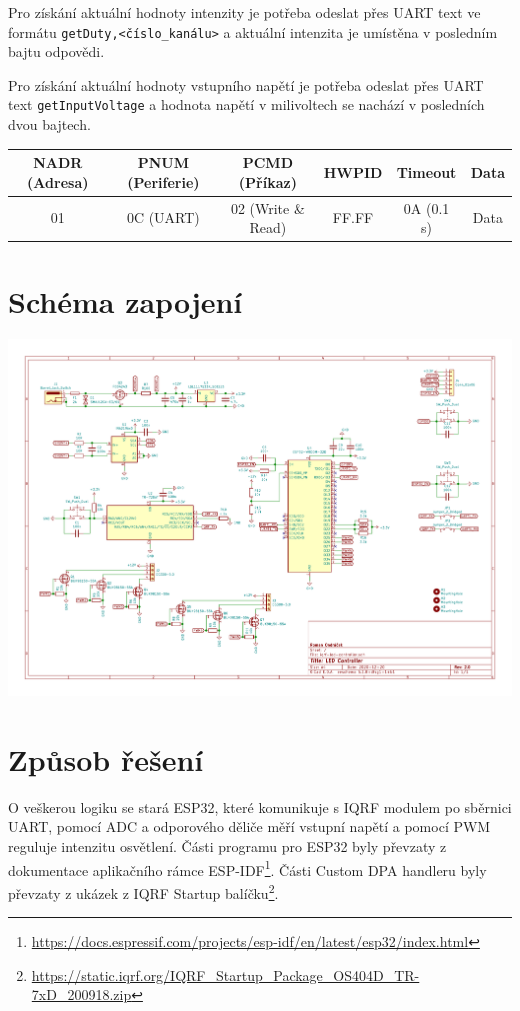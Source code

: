 \documentclass[12pt]{article}
\begin{document}
	Pro získání aktuální hodnoty intenzity je potřeba odeslat přes UART text ve formátu \texttt{getDuty,<číslo\_kanálu>} a aktuální intenzita je umístěna v posledním bajtu odpovědi.
	
	Pro získání aktuální hodnoty vstupního napětí je potřeba odeslat přes UART text \texttt{getInputVoltage} a hodnota napětí v milivoltech se nachází v posledních dvou bajtech.
	
	\begin{table}[h]
	\centering
	\begin{tabular}{|c|c|c|c|c|c|}
	\hline 
	\textbf{NADR (Adresa)} & \textbf{PNUM (Periferie)} & \textbf{PCMD (Příkaz)} & \textbf{HWPID} & \textbf{Timeout} & \textbf{Data} \\ 
	\hline 
	01 & 0C (UART) & 02 (Write \& Read) & FF.FF & 0A (0.1 s) & Data \\ 
	\hline 
	\end{tabular}
	\end{table} 	
	
	\newpage
	\section{Schéma zapojení}	
	
	\includegraphics[scale=0.8,angle=90]{img/schema.pdf}	
	
	\newpage	
	
	\section{Způsob řešení}	
	
	O veškerou logiku se stará ESP32, které komunikuje s IQRF modulem po sběrnici UART, pomocí ADC a odporového děliče měří vstupní napětí a pomocí PWM reguluje intenzitu osvětlení. Části programu pro ESP32 byly převzaty z dokumentace aplikačního rámce ESP-IDF\footnote{\url{https://docs.espressif.com/projects/esp-idf/en/latest/esp32/index.html}}. Části Custom DPA handleru byly převzaty z ukázek z IQRF Startup balíčku\footnote{\url{https://static.iqrf.org/IQRF_Startup_Package_OS404D_TR-7xD_200918.zip}}.
	
\end{document}
